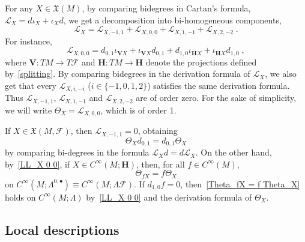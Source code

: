 \documentclass{memo-l}
\theoremstyle{plain}
\theoremstyle{definition}
\theoremstyle{remark}
\newcommand{\FF}{\mathcal{F}}
\newcommand{\LL}{\mathcal{L}}
\newcommand{\fX}{\mathfrak{X}}
\newcommand{\bfH}{\boldsymbol{H}}
\newcommand{\bfV}{\boldsymbol{V}}
\numberwithin{section}{chapter}
\numberwithin{equation}{section}%
\begin{document}
For any $X\in\fX(M)$, by comparing bidegrees in Cartan's formula, $\LL_X=d\iota_X+\iota_Xd$, we get a decomposition into bi-homogeneous components,
\[
\LL_X=\LL_{X,-1,1}+\LL_{X,0,0}+\LL_{X,1,-1}+\LL_{X,2,-2}\;.
\]
For instance,
\begin{equation}\label{LL_X 0 0}
\LL_{X,0,0}=d_{0,1}\iota_{\bfV X}+\iota_{\bfV X}d_{0,1}+d_{1,0}\iota_{\bfH X}+\iota_{\bfH X}d_{1,0}\;,
\end{equation}
where $\bfV:TM\to T\FF$ and $\bfH:TM\to\bfH$ denote the projections defined by~\eqref{splitting}. By comparing bidegrees in the derivation formula of $\LL_X$, we also get that every $\LL_{X,i,-i}$\index{$\LL_{X,i,-i}$} ($i\in\{-1,0,1,2\}$) satisfies the same derivation formula. Thus $\LL_{X,-1,1}$, $\LL_{X,1,-1}$ and $\LL_{X,2,-2}$ are of order zero. For the sake of simplicity, we will write $\Theta_X=\LL_{X,0,0}$, which is of order 1.

If $X\in\fX(M,\FF)$, then $\LL_{X,-1,1}=0$, obtaining
\begin{equation}\label{Theta_X d_0 1 = d_0 1 Theta_X}
\Theta_Xd_{0,1}=d_{0,1}\Theta_X
\end{equation} 
by comparing bi-degrees in the formula $\LL_Xd=d\LL_X$. On the other hand, by~\eqref{LL_X 0 0}, if $X\in C^\infty(M;\bfH)$, then, for all $f\in C^\infty(M)$,
\begin{equation}\label{Theta_fX = f Theta_X}
\Theta_{fX}=f\Theta_X
\end{equation}
on $C^\infty(M;\Lambda^{0,\bullet})\equiv C^\infty(M;\Lambda\FF)$. If $d_{1,0}f=0$, then~\eqref{Theta_fX = f Theta_X} holds on $C^\infty(M;\Lambda)$ by~\eqref{LL_X 0 0} and the derivation formula of $\Theta_X$.


\subsection{Local descriptions}\label{ss: local descriptions}
\end{document}
